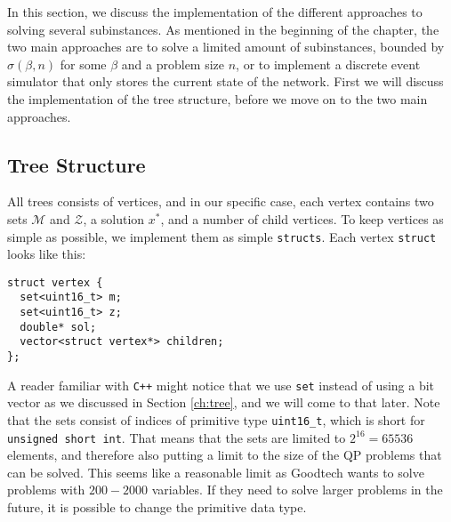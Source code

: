 In this section, we discuss the implementation of the different approaches to
solving several subinstances.
As mentioned in the beginning of the chapter, the two
main approaches are to solve a limited amount of subinstances, bounded
by $\sigma(\beta, n)$ for some $\beta$ and a problem size $n$, or to implement a discrete
event simulator that only stores the current state of the network.
First we will discuss the implementation of the tree structure, before we
move on to the two main approaches.

\subsection{Tree Structure}
All trees consists of vertices, and in our specific case, each vertex contains
two sets $\mathcal{M}$ and $\mathcal{Z}$, a solution $x^*$, and a number of
child vertices. To keep vertices as simple as possible, we implement them as
simple \texttt{structs}. Each vertex \texttt{struct} looks like
this:
\begin{verbatim}
struct vertex {
  set<uint16_t> m;
  set<uint16_t> z;
  double* sol;
  vector<struct vertex*> children;
};
\end{verbatim}
A reader familiar with \texttt{C++} might notice that we use
\texttt{set} instead of using a bit vector as we discussed
in Section \ref{ch:tree}, and we will come to that later. Note that
the sets consist of indices of primitive type \texttt{uint16\_t}, which is
short for \texttt{unsigned short int}. That means that the sets are limited to
$2^{16} = 65536$ elements, and therefore also putting a limit to the size
of the QP problems that can be solved. This seems like a reasonable limit
as Goodtech wants to solve problems with $200 - 2000$ variables.
If they need to solve larger problems in the future, it is possible to change
the primitive data type.

